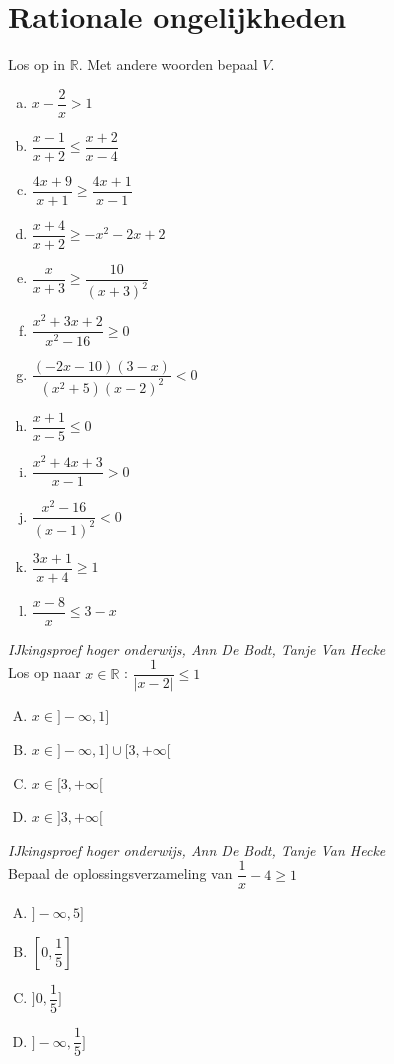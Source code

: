 \documentclass[12pt,twoside,a4paper]{article}
\begin{document}
\pagebreak
\section{Rationale ongelijkheden}

\begin{oefening}
Los op in $\mathbb{R}$. Met andere woorden bepaal $V$.
\begin{multicols}{2}
\begin{enumerate}[(a)]
  \itemsep.5em
  \item $x-\dfrac{2}{x}>1$
  \item $\dfrac{x-1}{x+2}\leq\dfrac{x+2}{x-4}$
  \item $\dfrac{4x+9}{x+1}\geq\dfrac{4x+1}{x-1}$
  \item $\dfrac{x+4}{x+2}\geq -x^2-2x+2$
  \item $\dfrac{x}{x+3}\geq\dfrac{10}{(x+3)^2}$
  \item $\dfrac{x^2+3x+2}{x^2-16}\geq0$
  \item $\dfrac{(-2x-10)(3-x)}{(x^2+5)(x-2)^2}<0$
  \item $\dfrac{x+1}{x-5}\leq 0$
  \item $\dfrac{x^2+4x+3}{x-1}>0$
  \item $\dfrac{x^2-16}{(x-1)^2}<0$
  \item $\dfrac{3x+1}{x+4}\geq 1$
  \item $\dfrac{x-8}{x}\leq 3-x$
\end{enumerate}
\end{multicols}
\end{oefening}

\begin{oefening}{\scriptsize\em IJkingsproef hoger onderwijs, Ann De Bodt, Tanje Van Hecke}\\
Los op naar $x\in\mathbb{R}$ : $\dfrac{1}{|x-2|}\leq 1$\\
\begin{enumerate}[(A)]
  \itemsep.5em
  \item $x\in]-\infty, 1]$
  \item $x\in]-\infty, 1]\cup[3,+\infty[$
  \item $x\in[3,+\infty[$
  \item $x\in]3,+\infty[$
\end{enumerate}
\end{oefening}

\begin{oefening}{\scriptsize\em IJkingsproef hoger onderwijs, Ann De Bodt, Tanje Van Hecke}\\
Bepaal de oplossingsverzameling van $\dfrac{1}{x} - 4 \geq 1$\\
\begin{enumerate}[(A)]
  \itemsep.5em
  \item $]-\infty, 5]$
  \item $[0, \dfrac{1}{5}]$
  \item $]0, \dfrac{1}{5}]$
  \item $]-\infty, \dfrac{1}{5}]$
\end{enumerate}
\end{oefening}
\end{document}
